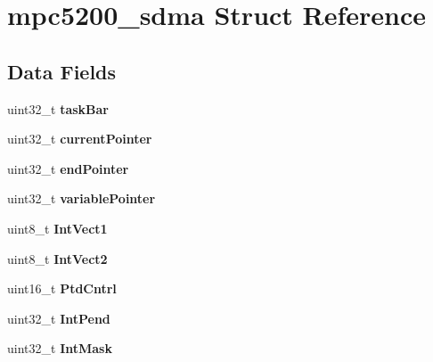 \hypertarget{structmpc5200__sdma}{}\section{mpc5200\+\_\+sdma Struct Reference}
\label{structmpc5200__sdma}
\subsection*{Data Fields}
\begin{DoxyCompactItemize}
\item 
\mbox{\label{structmpc5200__sdma_a31c2bedc23d383b8ae6b6d5c7ba905c8}} 
uint32\+\_\+t {\bfseries task\+Bar}
\item 
\mbox{\label{structmpc5200__sdma_ab4deb2779cf1cbc9ce8ee34572db4a78}} 
uint32\+\_\+t {\bfseries current\+Pointer}
\item 
\mbox{\label{structmpc5200__sdma_ac70d4f09b8a802444bedbbc733c94dc3}} 
uint32\+\_\+t {\bfseries end\+Pointer}
\item 
\mbox{\label{structmpc5200__sdma_a9a991056a68f4e86bc29b1e4edb71727}} 
uint32\+\_\+t {\bfseries variable\+Pointer}
\item 
\mbox{\label{structmpc5200__sdma_aa6653d191e41a0f77f235c593b3f57be}} 
uint8\+\_\+t {\bfseries Int\+Vect1}
\item 
\mbox{\label{structmpc5200__sdma_ae5498212e3671c5624317acba8bde194}} 
uint8\+\_\+t {\bfseries Int\+Vect2}
\item 
\mbox{\label{structmpc5200__sdma_a515485a3bebab697c71ffc36a00376a8}} 
uint16\+\_\+t {\bfseries Ptd\+Cntrl}
\item 
\mbox{\label{structmpc5200__sdma_aef471dc8fdab5dafad5995e7e187b7a9}} 
uint32\+\_\+t {\bfseries Int\+Pend}
\item 
\mbox{\label{structmpc5200__sdma_aba53bb43e3101553762dd2d8d8515144}} 
uint32\+\_\+t {\bfseries Int\+Mask}
\item 

\end{DoxyCompactItemize}
